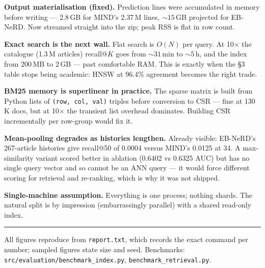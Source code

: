 \documentclass[10pt,a4paper]{article}
\newenvironment{tightitem}
  {\begin{list}{\textbullet}{%
     \setlength{\leftmargin}{1.1em}\setlength{\labelwidth}{0.7em}%
     \setlength{\labelsep}{0.4em}\setlength{\itemsep}{1pt}%
     \setlength{\parsep}{0pt}\setlength{\topsep}{2pt}%
     \setlength{\partopsep}{0pt}}}
  {\end{list}}
\begin{document}
\begin{tightitem}
\item \textbf{Output materialisation (fixed).} Prediction lines were accumulated in memory
before writing --- 2.8\,GB for MIND's 2.37\,M lines, ${\sim}15$\,GB projected for EB-NeRD.
Now streamed straight into the zip; peak RSS is flat in row count.
\item \textbf{Exact search is the next wall.} Flat search is $O(N)$ per query. At
10$\times$ the catalogue (1.3\,M articles) recall@$K$ goes from ${\sim}31$\,min to
${\sim}5$\,h, and the index from 200\,MB to 2\,GB --- past comfortable RAM. This is exactly
when the \S3 table stops being academic: HNSW at 96.4\% agreement becomes the right trade.
\item \textbf{BM25 memory is superlinear in practice.} The sparse matrix is built from
Python lists of \texttt{(row, col, val)} triples before conversion to CSR --- fine at
130\,K docs, but at 10$\times$ the transient list overhead dominates. Building CSR
incrementally per row-group would fix it.
\item \textbf{Mean-pooling degrades as histories lengthen.} Already visible: EB-NeRD's
267-article histories give recall@50 of 0.0004 versus MIND's 0.0125 at 34. A
max-similarity variant scored better in ablation (0.6402 vs 0.6325 AUC) but has no single
query vector and so cannot be an ANN query --- it would force different scoring for
retrieval and re-ranking, which is why it was not shipped.
\item \textbf{Single-machine assumption.} Everything is one process; nothing shards. The
natural split is by impression (embarrassingly parallel) with a shared read-only index.
\end{tightitem}

\vspace{1ex}\hrule\vspace{0.6ex}
{\footnotesize All figures reproduce from \texttt{report.txt}, which records the exact
command per number; sampled figures state size and seed. Benchmarks:
\texttt{src/evaluation/benchmark\_index.py}, \texttt{benchmark\_retrieval.py}.\par}
\end{document}
